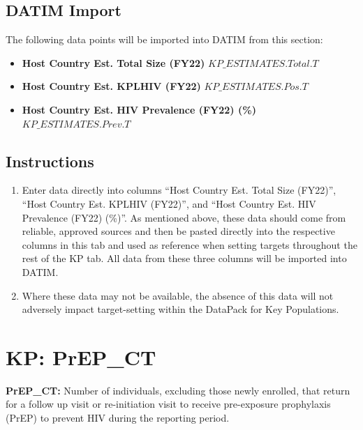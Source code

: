\documentclass[
  openany]{book}
\begin{document}
\hypertarget{datim-import-32}{%
\subsection{DATIM Import}\label{datim-import-32}}

The following data points will be imported into DATIM from this section:

\begin{itemize}
\item
  \textbf{Host Country Est. Total Size (FY22)} \(KP\_ESTIMATES.Total.T\)
\item
  \textbf{Host Country Est. KPLHIV (FY22)} \(KP\_ESTIMATES.Pos.T\)
\item
  \textbf{Host Country Est. HIV Prevalence (FY22) (\%)}
  \(KP\_ESTIMATES.Prev.T\)
\end{itemize}

\hypertarget{instructions-32}{%
\subsection{Instructions}\label{instructions-32}}

\begin{enumerate}
\def\labelenumi{\arabic{enumi}.}
\item
  Enter data directly into columns ``Host Country Est. Total Size
  (FY22)'', ``Host Country Est. KPLHIV (FY22)'', and ``Host Country Est.
  HIV Prevalence (FY22) (\%)''. As mentioned above, these data should
  come from reliable, approved sources and then be pasted directly
  into the respective columns in this tab and used as reference when
  setting targets throughout the rest of the KP tab. All data from
  these three columns will be imported into DATIM.
\item
  Where these data may not be available, the absence of this data will
  not adversely impact target-setting within the DataPack for Key
  Populations.\textbf{\hfill\break
  }
\end{enumerate}

\hypertarget{kp-prep_ct}{%
\section{KP: PrEP\_CT}\label{kp-prep_ct}}

\textbf{PrEP\_CT:} Number of individuals, excluding those newly enrolled, that
return for a follow up visit or re-initiation visit to receive
pre-exposure prophylaxis (PrEP) to prevent HIV during the reporting
period.
\end{document}
